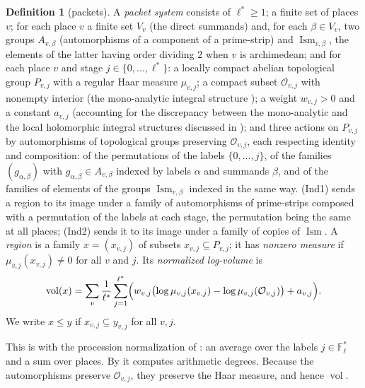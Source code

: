 \documentclass[11pt]{article}
\theoremstyle{plain}
\theoremstyle{definition}
\newtheorem{definition}[theorem]{Definition}
\theoremstyle{remark}
\newcommand{\vol}{\operatorname{vol}}
\newcommand{\cO}{\mathcal O}
\newcommand{\Ism}{\operatorname{Ism}}
\begin{document}
\begin{definition}[packets]\label{d:packet}
A \emph{packet system} consists of $\ell^*\ge1$; a finite set of places $v$; for each
place $v$ a finite set $V_v$ (the direct summands) and, for each $\beta\in V_v$, two groups
$A_{v,\beta}$ (automorphisms of a component of a prime-strip) and $\Ism_{v,\beta}$, the
elements of the latter having order dividing $2$ when $v$ is archimedean; and for each
place $v$ and stage $j\in\{0,\dots,\ell^*\}$: a locally compact abelian topological group
$P_{v,j}$ with a regular Haar measure $\mu_{v,j}$; a compact subset $\cO_{v,j}$ with
nonempty interior (the mono-analytic integral structure
\cite[Prop.~3.2(ii), Rem.~3.9.1(i)]{IUT3}); a weight $w_{v,j}>0$ and a constant $a_{v,j}$
(accounting for the discrepancy between the mono-analytic and the local holomorphic
integral structures discussed in \cite[Rem.~3.9.1]{IUT3}); and three actions on $P_{v,j}$
by automorphisms of topological groups preserving $\cO_{v,j}$, each respecting identity
and composition: of the permutations of the labels $\{0,\dots,j\}$, of the families
$(g_{\alpha,\beta})$ with $g_{\alpha,\beta}\in A_{v,\beta}$ indexed by labels $\alpha$ and
summands $\beta$, and of the families of elements of the groups $\Ism_{v,\beta}$ indexed in
the same way. (Ind1) sends a region to its image under a family of automorphisms of
prime-strips composed with a permutation of the labels at each stage, the permutation being
the same at all places; (Ind2) sends it to its image under a family of copies of $\Ism$.
A \emph{region} is a family $x=(x_{v,j})$ of subsets $x_{v,j}\subseteq P_{v,j}$; it has
\emph{nonzero measure} if $\mu_{v,j}(x_{v,j})\ne0$ for all $v$ and $j$. Its
\emph{normalized log-volume} is
\[
\vol(x)=\sum_v\frac1{\ell^*}\sum_{j=1}^{\ell^*}
\Bigl(w_{v,j}\bigl(\log\mu_{v,j}(x_{v,j})-\log\mu_{v,j}(\cO_{v,j})\bigr)+a_{v,j}\Bigr).
\]
We write $x\le y$ if $x_{v,j}\subseteq y_{v,j}$ for all $v,j$.
\end{definition}

This is \cite[Prop.~3.9(i)]{IUT3} with the procession normalization of
\cite[Rem.~3.1.1]{IUT3}: an average over the labels $j\in\mathbb F_\ell^*$ and a sum
over places. By \cite[Prop.~3.9(iii)]{IUT3} it computes arithmetic degrees. Because the
automorphisms preserve $\cO_{v,j}$, they preserve the Haar measure, and hence $\vol$.
\end{document}
